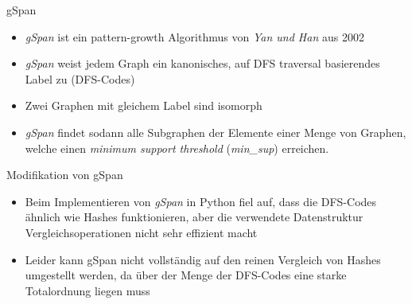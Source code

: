 \documentclass{beamer}
\begin{document}
\begin{frame}{gSpan}
\begin{itemize}
    \item \textit{gSpan} ist ein pattern-growth Algorithmus von \textit{Yan und Han} aus 2002
    \item \textit{gSpan} weist jedem Graph ein kanonisches, auf DFS traversal basierendes Label zu (DFS-Codes)
    \item Zwei Graphen mit gleichem Label sind isomorph
    \item \textit{gSpan} findet sodann alle Subgraphen der Elemente einer Menge von Graphen, welche einen \textit{minimum support threshold} (\textit{min\_sup}) erreichen.
\end{itemize}
\end{frame}

\begin{frame}{Modifikation von gSpan}
\begin{itemize}
    \item Beim Implementieren von \textit{gSpan} in Python fiel auf, dass die DFS-Codes ähnlich wie Hashes funktionieren, aber die verwendete Datenstruktur Vergleichsoperationen nicht sehr effizient macht
    \item Leider kann gSpan nicht vollständig auf den reinen Vergleich von Hashes umgestellt werden, da über der Menge der DFS-Codes eine starke Totalordnung liegen muss
\end{itemize}
\end{frame}
\end{document}
